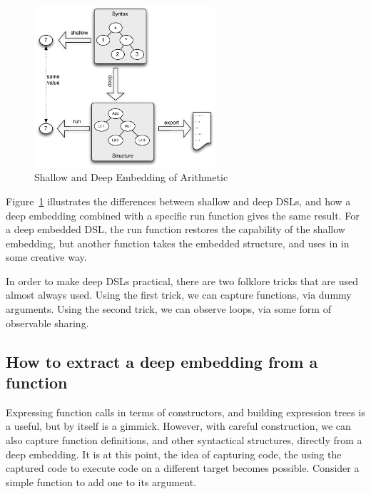 \documentclass[11pt]{article}
\begin{document}
\begin{figure}[!t]
  \centering        
  \includegraphics[width=0.6\textwidth]{images/DeepEmbedding.pdf}
  \caption{Shallow and Deep Embedding of Arithmetic}
  \label{fig:deep-dsls}
\end{figure}

Figure~\ref{fig:deep-dsls} illustrates the differences between shallow and deep DSLs,
and how a deep embedding combined with a specific run function gives the same result.
For a deep embedded DSL, the run function restores the capability of the shallow
embedding, but another function takes the embedded structure, and uses in in some creative way. 

In order to make deep DSLs practical, there are two folklore tricks that are used almost
always used.
Using the first trick, we can capture functions, via dummy arguments. Using the second trick, we can observe loops,
via some form of observable sharing. 

\subsection{How to extract a deep embedding from a function}

Expressing function calls in terms of constructors,  and
building expression trees is a useful, but by itself is a gimmick. 
However, with careful construction, we can also capture function definitions,
and other syntactical structures,
directly from a deep embedding. It is at this
point, the idea of capturing code,
the using the captured code to execute code
on a different target becomes possible.
Consider a simple function to add one to its argument.
\end{document}
